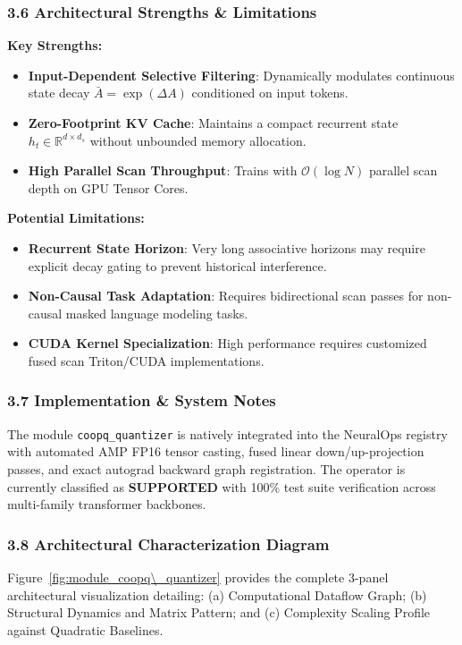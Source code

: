 \subsubsection*{3.6 Architectural Strengths \& Limitations}
\textbf{Key Strengths:}
\begin{itemize}
    \item \textbf{Input-Dependent Selective Filtering}: Dynamically modulates continuous state decay $\bar{A} = \exp(\Delta A)$ conditioned on input tokens.
    \item \textbf{Zero-Footprint KV Cache}: Maintains a compact recurrent state $h_t \in \mathbb{R}^{d \times d_s}$ without unbounded memory allocation.
    \item \textbf{High Parallel Scan Throughput}: Trains with $\mathcal{O}(\log N)$ parallel scan depth on GPU Tensor Cores.
\end{itemize}

\textbf{Potential Limitations:}
\begin{itemize}
    \item \textbf{Recurrent State Horizon}: Very long associative horizons may require explicit decay gating to prevent historical interference.
    \item \textbf{Non-Causal Task Adaptation}: Requires bidirectional scan passes for non-causal masked language modeling tasks.
    \item \textbf{CUDA Kernel Specialization}: High performance requires customized fused scan Triton/CUDA implementations.
\end{itemize}

\subsubsection*{3.7 Implementation \& System Notes}
The module \texttt{coopq\_quantizer} is natively integrated into the NeuralOps registry with automated AMP FP16 tensor casting, fused linear down/up-projection passes, and exact autograd backward graph registration. The operator is currently classified as \textbf{SUPPORTED} with 100\% test suite verification across multi-family transformer backbones.

\subsubsection*{3.8 Architectural Characterization Diagram}
Figure~\ref{fig:module_coopq\_quantizer} provides the complete 3-panel architectural visualization detailing: (a) Computational Dataflow Graph; (b) Structural Dynamics and Matrix Pattern; and (c) Complexity Scaling Profile against Quadratic Baselines.

